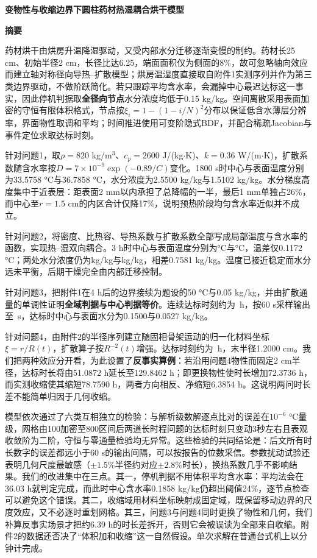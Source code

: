 \documentclass[zihao=-4,UTF8]{ctexart}
\begin{document}
\setcounter{page}{1}
\begin{center}
{\bfseries 变物性与收缩边界下圆柱药材热湿耦合烘干模型}

\vspace{1.0em}
{\bfseries 摘\quad 要}
\end{center}

药材烘干由烘房升温降湿驱动，又受内部水分迁移逐渐变慢的制约。药材长25 cm、初始半径2 cm，长径比达6.25，端面面积仅为侧面的8\%，故可忽略轴向效应而建立轴对称径向导热--扩散模型；烘房温湿度直接取自附件1实测序列并作为第三类边界驱动，不做阶跃简化。若只跟踪平均含水率，会漏掉中心最迟达标这一事实，因此停机判据取\textbf{全径向节点}水分浓度均低于0.15 kg/kg。空间离散采用表面加密的守恒有限体积格式，节点按$\xi_i=1-(1-i/N)^2$分布以保证低含水薄层分辨率，界面物性取调和平均；时间推进使用可变阶隐式BDF，并配合稀疏Jacobian与事件定位求取达标时刻。

针对问题1，取$\rho=820$ kg/m$^3$、$c_p=2600$ J/(kg$\cdot$K)、$k=0.36$ W/(m$\cdot$K)，扩散系数随含水率按$D=7\times10^{-9}\exp(-0.89/C)$变化。1800 s时中心与表面温度分别为33.5758 °C与36.7858 °C，水分浓度为2.5500 kg/kg与1.5102 kg/kg。水分梯度高度集中于近表层：距表面2 mm以内承担了总降幅的一半，最后1 mm单独占26\%，而中心至$r=1.5$ cm的内区合计仅降17\%，说明预热阶段均匀含水率近似并不成立。

针对问题2，将密度、比热容、导热系数与扩散系数全部写成局部温度与含水率的函数，实现热--湿双向耦合。3 h时中心与表面温度分别为\QTwoFinalCenterT °C与\QTwoFinalSurfaceT °C，温差仅0.1172 °C；两处水分浓度仍为\QTwoFinalCenterC kg/kg与\QTwoFinalSurfaceC kg/kg，相差0.7581 kg/kg。温度已接近稳定而水分远未平衡，后期干燥完全由内部迁移控制。

针对问题3，把附件1在4 h后的边界接续为题设的50 °C与0.05 kg/kg，并由扩散通量的单调性证明\textbf{全域判据与中心判据等价}。连续达标时刻约为\QThreeEventHours\ h，按60 s采样输出至\QThreeOutputSeconds\ s，达标时中心与表面水分为0.1500与0.0527 kg/kg。

针对问题4，由附件2的半径序列建立随固相骨架运动的归一化材料坐标$\xi=r/R(t)$，扩散算子按$R^{-2}(t)$增强。达标时刻约为\QFourEventHours\ h，末半径1.2000 cm。我们把两种效应分开看，为此设置了\textbf{反事实算例}：若沿用问题4物性而固定2 cm半径，达标时长将由51.0872 h延长至129.8462 h；即更换物性使时长增加72.3736 h，而实测收缩使其缩短78.7590 h，两者方向相反、净缩短6.3854 h。这说明两问时长差不能简单归因于几何收缩。

模型依次通过了六类互相独立的检验：与解析级数解逐点比对的误差在$10^{-6}$ °C量级，网格由100加密至800区间后两道长时程问题的达标时刻只变动3秒左右且表观收敛阶为二阶，守恒与零通量检验均无异常。这些检验的共同结论是：后文所有时长数字的误差都远小于60 s的输出间隔，可以按报告的位数采信。参数扰动试验还表明几何尺度最敏感（$\pm1.5\%$半径约对应$\pm2.8\%$时长），换热系数几乎不影响结果。我们的改进集中在三点。其一，停机判据不用体积平均含水率：平均法会在36.03 h就判定完成，而此时中心含水率0.1858 kg/kg仍超出阈值24\%，逐节点检查可以避免这个错误。其二，收缩域用材料坐标映射成固定域，既保留移动边界的尺度效应，又不必逐时重划网格。其三，问题3与问题4同时更换了物性和几何，我们补算反事实场景才把约6.39 h的时长差拆开，否则它会被误读为全部来自收缩。附件2的数据还否决了“体积加和收缩”这一自然假设。单次求解在普通台式机上以分钟计完成。
\end{document}
